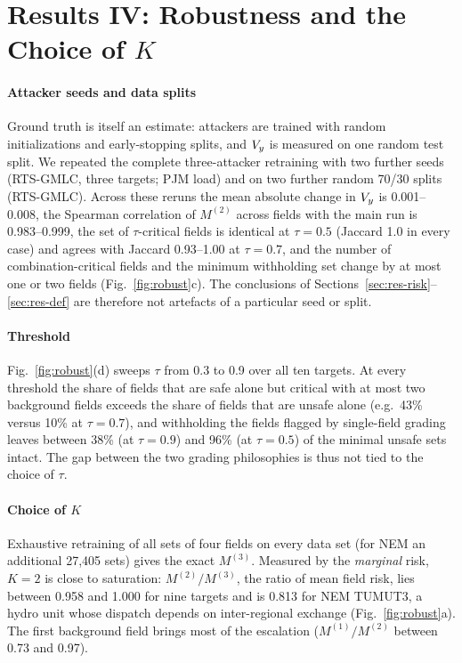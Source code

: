 \section{Results IV: Robustness and the Choice of $K$}\label{sec:res-robust}

\paragraph{Attacker seeds and data splits}
Ground truth is itself an estimate: attackers are trained with random initializations and
early-stopping splits, and $V_{y}$ is measured on one random test split. We repeated the complete
three-attacker retraining with two further seeds (RTS-GMLC, three targets; PJM load) and on two
further random 70/30 splits (RTS-GMLC). Across these reruns the mean absolute change in $V_{y}$ is
0.001--0.008, the Spearman correlation of $M^{(2)}$ across fields with the main run is 0.983--0.999,
the set of $\tau$-critical fields is identical at $\tau=0.5$ (Jaccard 1.0 in every case) and agrees
with Jaccard 0.93--1.00 at $\tau=0.7$, and the number of combination-critical fields and the minimum
withholding set change by at most one or two fields (Fig.~\ref{fig:robust}c). The conclusions of
Sections~\ref{sec:res-risk}--\ref{sec:res-def} are therefore not artefacts of a particular seed or
split.

\paragraph{Threshold}
Fig.~\ref{fig:robust}(d) sweeps $\tau$ from 0.3 to 0.9 over all ten targets. At every threshold the
share of fields that are safe alone but critical with at most two background fields exceeds the share
of fields that are unsafe alone (e.g.\ 43\% versus 10\% at $\tau=0.7$), and withholding the fields
flagged by single-field grading leaves between 38\% (at $\tau=0.9$) and 96\% (at $\tau=0.5$) of the
minimal unsafe sets intact. The gap between the two grading philosophies is thus not tied to the
choice of $\tau$.

\paragraph{Choice of $K$}
Exhaustive retraining of all sets of four fields on every data set (for NEM an additional 27,405 sets)
gives the exact $M^{(3)}$. Measured by the \emph{marginal} risk, $K=2$ is close to saturation:
$M^{(2)}/M^{(3)}$, the ratio of mean field risk, lies between 0.958 and 1.000 for nine targets and is
0.813 for NEM TUMUT3, a hydro unit whose dispatch depends on inter-regional exchange
(Fig.~\ref{fig:robust}a). The first background field brings most of the escalation ($M^{(1)}/M^{(2)}$
between 0.73 and 0.97).

